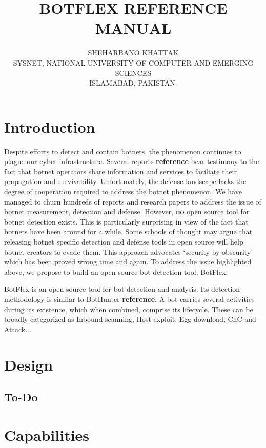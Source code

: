\documentclass[acmtocl]{acmtrans2m}
\title{BOTFLEX REFERENCE MANUAL}
\author{SHEHARBANO KHATTAK\\SYSNET, NATIONAL UNIVERSITY OF COMPUTER AND EMERGING SCIENCES\\ISLAMABAD, PAKISTAN.
}
\begin{document}


\maketitle


\section{Introduction}
Despite efforts to detect and contain botnets,
the phenomenon continues to plague our cyber infrastructure.
Several reports \textbf{reference} bear testimony to the fact
that botnet operators share information and services to faciliate
their propagation and survivability. 
Unfortunately, the defense landscape lacks the degree
of cooperation required to address the botnet phenomenon.
We have managed to churn hundreds of reports and research papers 
to address the issue of botnet measurement, detection and defense.
However, \textbf{no} open source tool for botnet detection exists.
This is particularly surprising in view of the fact that botnets
have been around for a while.
Some schools of thought may argue that releasing botnet
specific detection and defense tools in open source
will help botnet creators to evade them. 
This approach advocates `security by obscurity' which has been
proved wrong time and again.  
To address the issue highlighted above, we propose to build
an open source bot detection tool, BotFlex.
 
BotFlex is an open source tool for bot detection and analysis. 
Its detection methodology is similar to BotHunter \textbf{reference}.
A bot carries several activities during its existence, which
when combined, comprise its lifecycle. These can be broadly 
categorized as Inbound scanning, Host exploit, Egg download, CnC
and Attack... 
     

\section{Design} 
\label{sec:design}

\subsection{To-Do} 
\label{sec:design_todo}

\section{Capabilities} 
\end{document}
